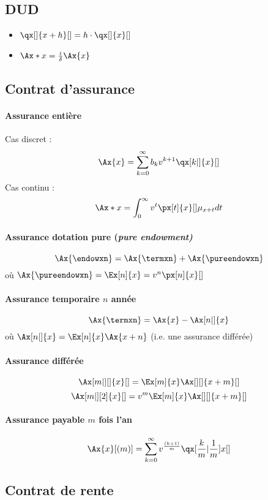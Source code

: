 \documentclass[10pt, french]{article}
\begin{document}
\begin{multicols*}{2}
\subsection*{DUD}
\begin{itemize}
\item $\qx[]{x+h}[] = h \cdot \qx[]{x}[]$
\item $\Ax*{x} = \frac{i}{\delta} \Ax{x}$
\end{itemize}



\subsection*{Contrat d'assurance}
\paragraph{Assurance entière}
Cas discret : 
\[\Ax{x} = \sum_{k=0}^{\infty} b_k v^{k+1} \qx[k|]{x}[]\]
Cas continu : 
\[\Ax*{x} = \int_{0}^{\infty} v^t \px[t]{x}[] \mu_{x+t} dt  \]

\paragraph{Assurance dotation pure (\emph{pure endowment)}}
\[\Ax{\endowxn} = \Ax{\termxn} + \Ax{\pureendowxn}\]
où $\Ax{\pureendowxn} = \Ex[n]{x} = v^n \px[n]{x}[]$

\paragraph{Assurance temporaire $n$ année}
\[\Ax{\termxn} = \Ax{x} - \Ax[n|]{x} \]
où $\Ax[n|]{x}  = \Ex[n]{x} \Ax{x+n}$ (i.e. une assurance différée)

\paragraph{Assurance différée}
\[\Ax[m|][]{x}[] = \Ex[m]{x} \Ax[][]{x+m}[]\]
\[\Ax[m|][2]{x}[] = v^{m} \Ex[m]{x} \Ax[][]{x+m}[]\]

\paragraph{Assurance payable $m$ fois l'an}
\[\Ax{x}[(m)] = \sum_{k=0}^{\infty} v^{\frac{(k+1)}{m}} \qx[\frac{k}{m} | \frac{1}{m}]{x}[] \]


\subsection*{Contrat de rente}

\end{multicols*}
\end{document}
